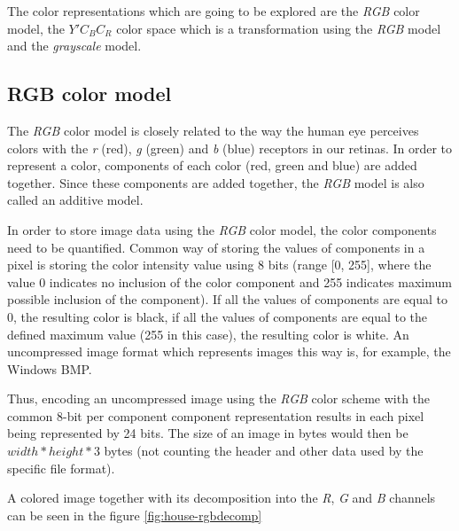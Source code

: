 \documentclass[thesis=M,english]{FITthesis}[2012/10/20]
\begin{document}
The color representations which are going to be explored are the \emph{RGB} color model, the $Y'C_{B}C_{R}$ color
space which is a transformation using the \emph{RGB} model and the
\emph{grayscale} model.

\subsection{RGB color model}
The \emph{RGB} color model is closely related to the way the human eye perceives colors
with the \emph{r} (red), \emph{g} (green) and \emph{b} (blue) receptors in our retinas.\cite{img:color-theory}
In order to represent a color, components of each color (red, green and blue) are added together.
Since these components are added together, the \emph{RGB} model is also called an additive model.

In order to store image data using the \emph{RGB} color model, the color components
need to be quantified. Common way of storing the values of components in a pixel
is storing the color intensity value using 8 bits (range [0, 255], where the
value 0 indicates no inclusion of the color component and 255 indicates maximum
possible inclusion of the component). If all the values of components are
equal to 0, the resulting color is black, if all the values of components are
equal to the defined maximum value (255 in this case), the resulting color
is white. An uncompressed image format which represents images this way is, for
example, the Windows BMP.\cite{fileformat-bmp}

Thus, encoding an uncompressed image using the \emph{RGB} color scheme with
the common 8-bit per component component representation results in each pixel
being represented by 24 bits. The size of an image in bytes would then be
$width*height*3$ bytes (not counting the header and other data used by the
specific file format).

A colored image together with its decomposition into the \emph{R}, \emph{G}
and \emph{B} channels can be seen in the figure \ref{fig:house-rgbdecomp}
\end{document}
